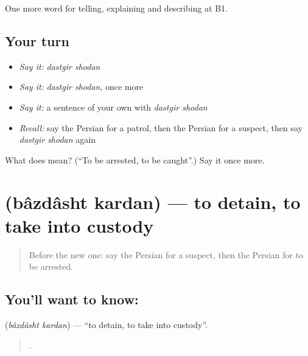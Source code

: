 \begin{grammarlens}[title={What you've built}]
One more word for telling, explaining and describing at B1.
\end{grammarlens}

\subsection*{Your turn}
\begin{itemize}
\raggedright
  \item \emph{Say it:} \emph{dastgir shodan}
  \item \emph{Say it:} \emph{dastgir shodan}, once more
  \item \emph{Say it:} a sentence of your own with \emph{dastgir shodan}
  \item \emph{Recall:} say the Persian for a patrol, then the Persian for a suspect, then say \emph{dastgir shodan} again
\end{itemize}

\begin{tcolorbox}[breakable,colback=teal!4,colframe=teal!35!black,title={Before you move on}]
What does   mean? (\textquotedblleft{}To be arrested, to be caught\textquotedblright{}.) Say it once more.
\end{tcolorbox}
\section[\texorpdfstring{\fa{بازداشت} \fa{کردن} (bâzdâsht kardan)}{بازداشت کردن (bâzdâsht kardan)}]{  (bâzdâsht kardan) — to detain, to take into custody}

\label{lesson:FA-C319-bazdasht-kardan}



\begin{quote}
Before the new one: say the Persian for a suspect, then the Persian for to be arrested.
\end{quote}

\subsection*{You'll want to know:  }
\textbf{ } (\emph{bâzdâsht kardan}) — \textquotedblleft{}to detain, to take into custody\textquotedblright{}.

\begin{quote}
       .
\end{quote}


